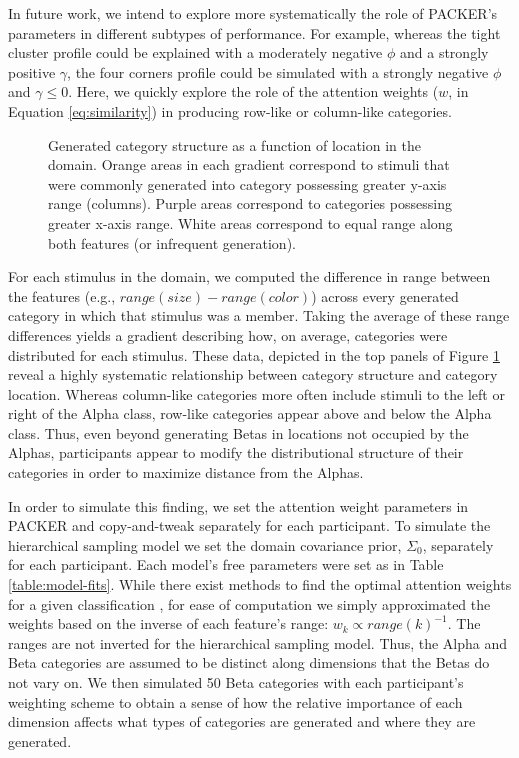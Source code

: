 \documentclass[10pt,letterpaper]{article}
\newcommand\inputpgf[2]{{
\let\pgfimageWithoutPath\pgfimage
\renewcommand{\pgfimage}[2][]{\pgfimageWithoutPath[##1]{#1/##2}}

}}
\begin{document}
In future work, we intend to explore more systematically the role of PACKER's parameters in different subtypes of performance. For example, whereas the tight cluster profile could be explained with a moderately negative $\phi$ and a strongly positive $\gamma$, the four corners profile could be simulated with a strongly negative $\phi$ and $\gamma\leq0$. Here, we quickly explore the role of the attention weights ($w$, in Equation \ref{eq:similarity}) in producing row-like or column-like categories.

\begin{figure}[ht!]
    \begin{center}
    \inputpgf{figs/}{range-diff-gradient.pgf}
    \caption{Generated category structure as a function of location in the domain. Orange areas in each gradient correspond to stimuli that were commonly generated into category possessing greater y-axis range (columns). Purple areas correspond to categories possessing greater x-axis range. White areas correspond to equal range along both features (or infrequent generation).}
    \label{fig:range-diff-gradient}
    \end{center}
\end{figure}

For each stimulus in the domain, we computed the difference in range between the features (e.g., $range(size) - range(color)$) across every generated category in which that stimulus was a member. Taking the average of these range differences yields a gradient describing how, on average, categories were distributed for each stimulus. These data, depicted in the top panels of Figure \ref{fig:range-diff-gradient} reveal a highly systematic relationship between category structure and category location. Whereas column-like categories more often include stimuli to the left or right of the Alpha class, row-like categories appear above and below the Alpha class.  Thus, even beyond generating Betas in locations not occupied by the Alphas, participants appear to modify the distributional structure of their categories in order to maximize distance from the Alphas.

In order to simulate this finding, we set the attention weight parameters in PACKER and copy-and-tweak separately for each participant. To simulate the hierarchical sampling model we set the domain covariance prior, $\Sigma_0$, separately for each participant. Each model's free parameters were set as in Table \ref{table:model-fits}. While there exist methods to find the optimal attention weights for a given classification \citep[see][]{vanpaemel2012using}, for ease of computation we simply approximated the weights based on the inverse of each feature's range: $w_k \propto range(k)^{-1}$. The ranges are not inverted for the hierarchical sampling model. Thus, the Alpha and Beta categories are assumed to be distinct along dimensions that the Betas do not vary on. We then simulated 50 Beta categories with each participant's weighting scheme to obtain a sense of how the relative importance of each dimension affects what types of categories are generated and where they are generated. 
\end{document}
